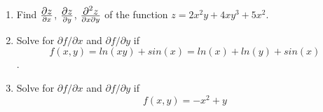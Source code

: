 \documentclass[a4paper,12pt]{article}
\begin{document}
\begin{enumerate}
	\item Find ${ \displaystyle \partial{z} \over \partial{x} }$, ${ \displaystyle \partial{z} \over \partial{y} }$, ${ \displaystyle \partial^2{z} \over \partial{x}\partial{y} }$ 
	of the function $z = 2x^2y+4xy^3+5x^2$.		             

\item 


Solve for $\displaystyle{\partial f/\partial x}$ and $\displaystyle{\partial f/\partial y}$ if \[f(x,y)= ln(xy) +sin(x) = ln(x) + ln(y)+ sin(x)\].



\item 
Solve for $\displaystyle{\partial  f/\partial x}$ and $\displaystyle{\partial f/\partial y}$ if \[f(x,y) = -x^2+y\]



	\end{enumerate}
	
	
\end{document}
